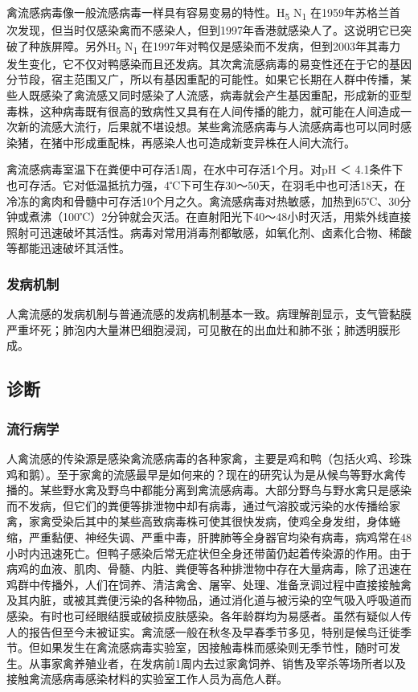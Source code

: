 禽流感病毒像一般流感病毒一样具有容易变易的特性。H\textsubscript{5}
N\textsubscript{1}
在1959年苏格兰首次发现，但当时仅感染禽而不感染人，但到1997年香港就感染人了。这说明它已突破了种族屏障。另外H\textsubscript{5}
N\textsubscript{1}
在1997年对鸭仅是感染而不发病，但到2003年其毒力发生变化，它不仅对鸭感染而且还发病。其次禽流感病毒的易变性还在于它的基因分节段，宿主范围又广，所以有基因重配的可能性。如果它长期在人群中传播，某些人既感染了禽流感又同时感染了人流感，病毒就会产生基因重配，形成新的亚型毒株，这种病毒既有很高的致病性又具有在人间传播的能力，就可能在人间造成一次新的流感大流行，后果就不堪设想。某些禽流感病毒与人流感病毒也可以同时感染猪，在猪中形成重配株，再感染人也可造成新变异株在人间大流行。

禽流感病毒室温下在粪便中可存活1周，在水中可存活1个月。对pH ＜
4.1条件下也可存活。它对低温抵抗力强，4℃下可生存30～50天，在羽毛中也可活18天，在冷冻的禽肉和骨髓中可存活10个月之久。禽流感病毒对热敏感，加热到65℃、30分钟或煮沸（100℃）2分钟就会灭活。在直射阳光下40～48小时灭活，用紫外线直接照射可迅速破坏其活性。病毒对常用消毒剂都敏感，如氧化剂、卤素化合物、稀酸等都能迅速破坏其活性。

\subsubsection{发病机制}

人禽流感的发病机制与普通流感的发病机制基本一致。病理解剖显示，支气管黏膜严重坏死；肺泡内大量淋巴细胞浸润，可见散在的出血灶和肺不张；肺透明膜形成。

\subsection{诊断}

\subsubsection{流行病学}

人禽流感的传染源是感染禽流感病毒的各种家禽，主要是鸡和鸭（包括火鸡、珍珠鸡和鹅）。至于家禽的流感最早是如何来的？现在的研究认为是从候鸟等野水禽传播的。某些野水禽及野鸟中都能分离到禽流感病毒。大部分野鸟与野水禽只是感染而不发病，但它们的粪便等排泄物中却有病毒，通过气溶胶或污染的水传播给家禽，家禽受染后其中的某些高致病毒株可使其很快发病，使鸡全身发绀，身体蜷缩，严重黏便、神经失调、严重中毒，肝脾肺等全身器官均染有病毒，病鸡常在48小时内迅速死亡。但鸭子感染后常无症状但全身还带菌仍起着传染源的作用。由于病鸡的血液、肌肉、骨髓、内脏、粪便等各种排泄物中存在大量病毒，除了迅速在鸡群中传播外，人们在饲养、清洁禽舍、屠宰、处理、准备烹调过程中直接接触禽及其内脏，或被其粪便污染的各种物品，通过消化道与被污染的空气吸入呼吸道而感染。有时也可经眼结膜或破损皮肤感染。各年龄群均为易感者。虽然有疑似人传人的报告但至今未被证实。禽流感一般在秋冬及早春季节多见，特别是候鸟迁徙季节。但如果发生在禽流感病毒实验室，因接触毒株而感染则无季节性，随时可发生。从事家禽养殖业者，在发病前1周内去过家禽饲养、销售及宰杀等场所者以及接触禽流感病毒感染材料的实验室工作人员为高危人群。

